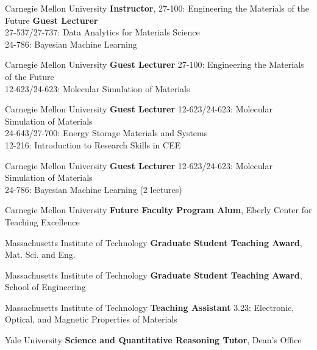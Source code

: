 \vspace{-1mm}
    {Carnegie Mellon University}
    {\textbf{Instructor}, 27-100: Engineering the Materials of the Future}{}
    {\textbf{Guest Lecturer}\\
    27-537/27-737: Data Analytics for Materials Science\\
    24-786: Bayesian Machine Learning}

\vspace{-3mm}
    {Carnegie Mellon University}
    {\textbf{Guest Lecturer}}
    {27-100: Engineering the Materials of the Future\\
    12-623/24-623: Molecular Simulation of Materials}

\vspace{-3mm}
    {Carnegie Mellon University}
    {\textbf{Guest Lecturer}}
    {12-623/24-623: Molecular Simulation of Materials\\
    24-643/27-700: Energy Storage Materials and Systems\\
    12-216: Introduction to Research Skills in CEE}

\vspace{-3mm}
    {Carnegie Mellon University}
    {\textbf{Guest Lecturer}}
    {12-623/24-623: Molecular Simulation of Materials\\
    24-786: Bayesian Machine Learning (2 lectures)}

\vspace{2.2mm}
\datedsubsectionnarrow{}
    {Carnegie Mellon University}
    {\textbf{Future Faculty Program Alum}, Eberly Center for Teaching Excellence}{}

\vspace{2.2mm}
    {Massachusetts Institute of Technology}
    {\textbf{Graduate Student Teaching Award}, Mat. Sci. and Eng.}{}

\datedsubsectionnarrow{}
    {Massachusetts Institute of Technology}
    {\textbf{Graduate Student Teaching Award}, School of Engineering}{}

\vspace{-3mm}
    {Massachusetts Institute of Technology}
    {\textbf{Teaching Assistant}}
    {3.23: Electronic, Optical, and Magnetic Properties of Materials}

\vspace{2.2mm}
    {Yale University}
    {\textbf{Science and Quantitative Reasoning Tutor}, Dean's Office}{}
